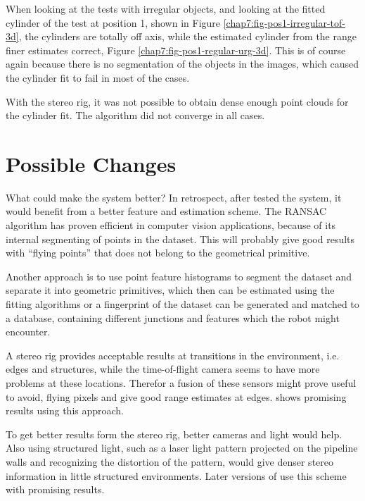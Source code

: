 When looking at the tests with irregular objects, and looking at the fitted cylinder of
the test at position 1, shown in Figure \ref{chap7:fig-pos1-irregular-tof-3d}, the
cylinders are totally off axis, while the estimated cylinder from the range finer
estimates correct, Figure \ref{chap7:fig-pos1-regular-urg-3d}. This is of course again
because there is no segmentation of the objects in the images, which caused the cylinder
fit to fail in most of the cases. 

With the stereo rig, it was not possible to obtain dense enough point clouds for the
cylinder fit. The algorithm did not converge in all cases. 

\section{Possible Changes}
What could make the system better? In retrospect, after tested the system, it would
benefit from a better feature and estimation scheme. The RANSAC algorithm has proven
efficient in computer vision applications, because of its internal segmenting of points in 
the dataset. This will probably give good results with ``flying points'' that does not
belong to the geometrical primitive. 

Another approach is to use point feature histograms to segment the dataset and separate it
into geometric primitives, which then can be estimated using the fitting algorithms or a
fingerprint of the dataset can be generated and matched to a database, containing
different junctions and features which the robot might encounter. 

A stereo rig provides acceptable results at transitions in the environment, i.e. edges and
structures, while the time-of-flight camera seems to have more problems at these locations.
Therefor a fusion of these sensors might prove useful to avoid, flying pixels and give good
range estimates at edges. \cite{tof-stereo-fusion} shows promising results using this
approach. 

To get better results form the stereo rig, better cameras and light would help. Also using
structured light, such as a laser light pattern projected on the pipeline walls and
recognizing the distortion of the pattern, would give denser stereo information in little
structured environments. Later versions of \cite{makro-plus} use this scheme with promising
results. 


